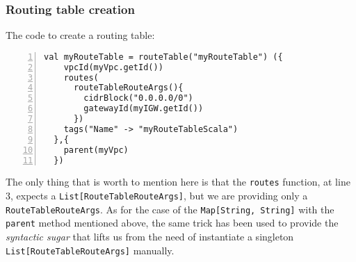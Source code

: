 \subsubsection{Routing table creation}
\label{sssec:routetable-creation-scala}
The code to create a routing table:\\
\begin{minipage}{\linewidth}
\begin{lstlisting}[numbers=left, numberstyle=\tiny, numbersep=-5pt, stepnumber=1]
  val myRouteTable = routeTable("myRouteTable") ({
    vpcId(myVpc.getId())
    routes(
      routeTableRouteArgs(){
        cidrBlock("0.0.0.0/0")
        gatewayId(myIGW.getId())
      })
    tags("Name" -> "myRouteTableScala")
  },{
    parent(myVpc)
  })
\end{lstlisting}
\end{minipage}
The only thing that is worth to mention here is that the \texttt{routes} function, at line 3, expects a \texttt{List[RouteTableRouteArgs]}, but we are providing only a \texttt{RouteTableRouteArgs}.
As for the case of the \texttt{Map[String, String]} with the \texttt{parent} method mentioned above, the same trick has been used to provide the \textit{syntactic sugar} that lifts us from the need of instantiate a singleton \texttt{List[RouteTableRouteArgs]} manually.

